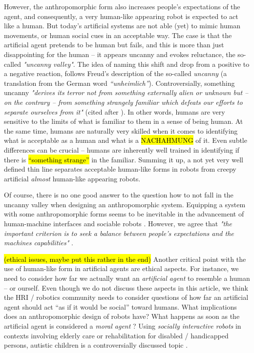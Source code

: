 \documentclass{frontiersSCNS} %
\begin{document}
However, the anthropomorphic form also 
increases people's expectations of the agent, and consequently, a very human-like 
appearing robot is expected to act like a human. But today's artificial systems are 
not able (yet) to mimic human movements, or human social cues in an acceptable way. 
The case is that the artificial agent pretends to be human but fails, and this is 
more than just disappointing for the 
human -- it appears uncanny and evokes reluctance, the so-called 
\textit{"uncanny valley"}. The idea of naming this shift and drop from a positive to a negative reaction,
follows Freud's description of the so-called \textit{uncanny} (a translation from the German word 
\textit{``unheimlich''}). Controversially, something uncanny \textit{"derives its terror not from 
something externally alien or unknown but -- on the contrary -- from something 
strangely familiar which defeats our efforts to separate ourselves from it"} (cited 
after \cite{hegel_understanding_2008}).
In other words, humans are very sensitive to the limits of what is familiar to them 
in a sense of being human. At the same time, humans are naturally very skilled when 
it comes to identifying what is acceptable as a human and what is a \hl{NACHAHMUNG} 
of it. Even subtle differences can be crucial -- humans are inherently well trained 
in identifying if there is \hl{``something strange''} in the familiar.
Summing it up, a not yet very well defined thin line separates acceptable human-like forms in 
robots from creepy artificial \textit{almost} human-like appearing robots.

 
Of course, there is no one good answer to the question how to not fall in the 
uncanny valley when designing an anthropomorphic system. Equipping a system with 
some anthropomorphic forms seems to be inevitable 
\cite{duffy_anthropomorphism_2002} in the advancement of human-machine interfaces 
and sociable robots \citep{breazeal_sociable_2000}. However, we agree that 
\textit{"the important criterion is to seek a balance between people's expectations 
and the machines capabilities"} \citep{duffy_anthropomorphism_2002}. 

\hl{(ethical issues, maybe put this rather in the end)}
Another critical point with the use of human-like form in artificial agents are 
ethical aspects. For instance, we need to consider how far we actually want an 
\textit{artificial agent} to resemble a human -- or ourself. Even though we do not 
discuss these aspects in this article, we think the HRI / robotics community needs 
to consider questions of how far an artificial agent should act ``as if it would be 
social'' toward humans. What implications does an anthropomorphic design of robots 
have? What happens as soon as the artificial agent is considered a \textit{moral 
agent} \cite{sullins_when_2006}? Using \textit{socially interactive robots} in 
contexts involving elderly care or rehabilitation for disabled / handicapped 
persons, autistic children is a controversially discussed topic 
\cite{robins_robots_2005}.
\end{document}
